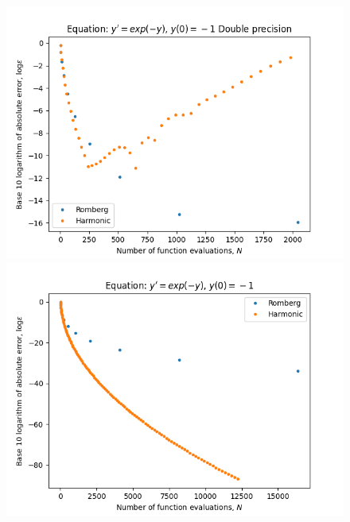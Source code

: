\begin{figure}[H]
\centering
\begin{minipage}{0.45\textwidth}
\centering
\includegraphics[scale=0.45]{../results/emr_plots/ln_em1.png}
\end{minipage}
\begin{minipage}{0.45\textwidth}
\centering
\includegraphics[scale=0.45]{../results/emr_plots/ln_em1_hp.png}
\end{minipage}
\end{figure}

